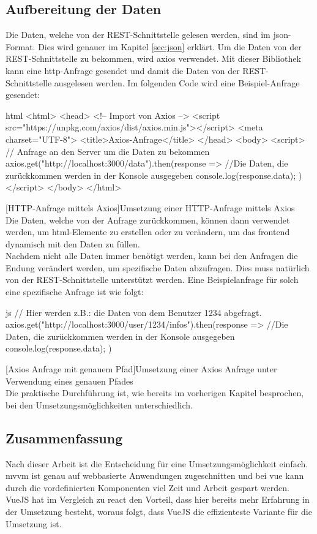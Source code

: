 \subsection{Aufbereitung der Daten}
Die Daten, welche von der REST-Schnittstelle gelesen werden, sind im \Gls{json}-Format. Dies wird genauer im Kapitel \autoref{sec:json} erklärt. Um die Daten von der REST-Schnittstelle zu bekommen, wird \Gls{axios} verwendet. Mit dieser Bibliothek kann eine \Gls{http}-Anfrage gesendet und damit die Daten von der REST-Schnittstelle ausgelesen werden. Im folgenden Code wird eine Beispiel-Anfrage gesendet:
\begin{code}{html}
	<html>
		<head>
			<!-- Import von Axios -->
			<script src="https://unpkg.com/axios/dist/axios.min.js"></script>
			<meta charset="UTF-8">
			<title>Axios-Anfrage</title>
		</head>
		<body>
			<script>
				// Anfrage an den Server um die Daten zu bekommen
				axios.get("http://localhost:3000/data").then(response => {
					//Die Daten, die zurückkommen werden in der Konsole ausgegeben
					console.log(response.data);
				})
			</script>
		</body>
	</html>
\end{code}
[HTTP-Anfrage mittels Axios]{Umsetzung einer HTTP-Anfrage mittels Axios}~\\
Die Daten, welche von der Anfrage zurückkommen, können dann verwendet werden, um \Gls{html}-Elemente zu erstellen oder zu verändern, um das \Gls{frontend} dynamisch mit den Daten zu füllen.\\Nachdem nicht alle Daten immer benötigt werden, kann bei den Anfragen die Endung verändert werden, um spezifische Daten abzufragen. Dies muss natürlich von der REST-Schnittstelle unterstützt werden. Eine Beispielanfrage für solch eine spezifische Anfrage ist wie folgt:
\begin{code}{js}
	// Hier werden z.B.: die Daten von dem Benutzer 1234 abgefragt.
	axios.get("http://localhost:3000/user/1234/infos").then(response => {
		//Die Daten, die zurückkommen werden in der Konsole ausgegeben
		console.log(response.data);
	})
\end{code}
[Axios Anfrage mit genauem Pfad]{Umsetzung einer Axios Anfrage unter Verwendung eines genauen Pfades}~\\
Die praktische Durchführung ist, wie bereits im vorherigen Kapitel besprochen, bei den Umsetzungsmöglichkeiten unterschiedlich.
\subsection{Zusammenfassung}
\label{sec:rfoster_fazit}
Nach dieser Arbeit ist die Entscheidung für eine Umsetzungsmöglichkeit einfach. \Gls{mvvm} ist genau auf webbasierte Anwendungen zugeschnitten und bei \Gls{vue} kann durch die vordefinierten Komponenten viel Zeit und Arbeit gespart werden. VueJS hat im Vergleich zu \Gls{react} den Vorteil, dass hier bereits mehr Erfahrung in der Umsetzung besteht, woraus folgt, dass VueJS die effizienteste Variante für die Umsetzung ist.